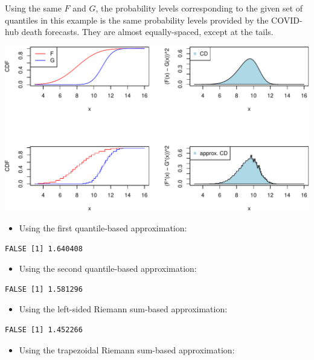 \documentclass[
]{article}
\providecommand{\tightlist}{%
  \setlength{\itemsep}{0pt}\setlength{\parskip}{0pt}}
\begin{document}
Using the same \(F\) and \(G\), the probability levels corresponding to
the given set of quantiles in this example is the same probability
levels provided by the COVID-hub death forecasts. They are almost
equally-spaced, except at the tails.

\begin{center}\includegraphics{cd_approx_2_files/figure-latex/unnamed-chunk-29-1} \end{center}

\begin{itemize}
\tightlist
\item
  Using the first quantile-based approximation:
\end{itemize}

\begin{verbatim}
FALSE [1] 1.640408
\end{verbatim}

\begin{itemize}
\tightlist
\item
  Using the second quantile-based approximation:
\end{itemize}

\begin{verbatim}
FALSE [1] 1.581296
\end{verbatim}

\begin{itemize}
\tightlist
\item
  Using the left-sided Riemann sum-based approximation:
\end{itemize}

\begin{verbatim}
FALSE [1] 1.452266
\end{verbatim}

\begin{itemize}
\tightlist
\item
  Using the trapezoidal Riemann sum-based approximation:
\end{itemize}
\end{document}
